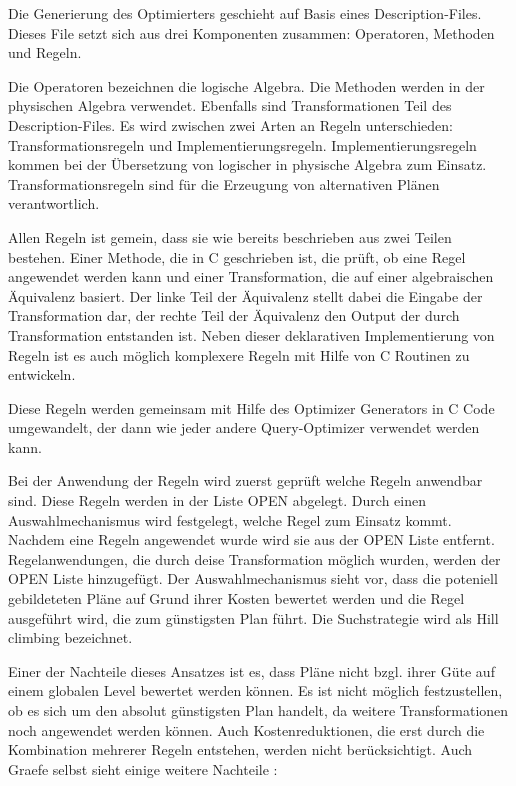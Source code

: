 Die Generierung des Optimierters geschieht auf Basis eines Description-Files. Dieses File setzt sich aus drei Komponenten zusammen: Operatoren, Methoden und Regeln.


Die Operatoren bezeichnen die logische Algebra. Die Methoden werden in der physischen Algebra verwendet. Ebenfalls sind Transformationen Teil des Description-Files. Es wird zwischen zwei Arten an Regeln unterschieden: Transformationsregeln und Implementierungsregeln. Implementierungsregeln kommen bei der Übersetzung von logischer in physische Algebra zum Einsatz. Transformationsregeln sind für die Erzeugung von alternativen Plänen verantwortlich.

Allen Regeln ist gemein, dass sie wie bereits beschrieben aus zwei Teilen bestehen. Einer Methode, die in C geschrieben ist, die prüft, ob eine Regel angewendet werden kann und einer Transformation, die auf einer algebraischen Äquivalenz basiert. Der linke Teil der Äquivalenz stellt dabei die Eingabe der Transformation dar, der rechte Teil der Äquivalenz den Output der durch Transformation entstanden ist. Neben dieser deklarativen Implementierung von Regeln ist es auch möglich komplexere Regeln mit Hilfe von C Routinen zu entwickeln.

Diese Regeln werden gemeinsam mit Hilfe des Optimizer Generators in C Code umgewandelt, der dann wie jeder andere Query-Optimizer verwendet werden kann. 

Bei der Anwendung der Regeln wird zuerst geprüft welche Regeln anwendbar sind. Diese Regeln werden in der Liste OPEN abgelegt. Durch einen Auswahlmechanismus wird festgelegt, welche Regel zum Einsatz kommt. Nachdem eine Regeln angewendet wurde wird sie aus der OPEN Liste entfernt. Regelanwendungen, die durch deise Transformation möglich wurden, werden der OPEN Liste hinzugefügt. Der Auswahlmechanismus sieht vor, dass die poteniell gebildeteten Pläne auf Grund ihrer Kosten bewertet werden und die Regel ausgeführt wird, die zum günstigsten Plan führt. Die Suchstrategie wird als Hill climbing bezeichnet.

Einer der Nachteile dieses Ansatzes ist es, dass Pläne nicht bzgl. ihrer Güte auf einem globalen Level bewertet werden können. Es ist nicht möglich festzustellen, ob es sich um den absolut günstigsten Plan handelt, da weitere Transformationen noch angewendet werden können. Auch Kostenreduktionen, die erst durch die Kombination mehrerer Regeln entstehen, werden nicht berücksichtigt. Auch Graefe selbst sieht einige weitere Nachteile \cite{graefe1993volcano}:

